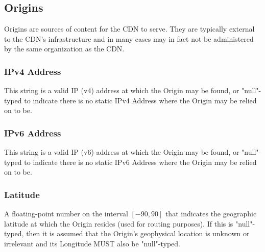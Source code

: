 %
%

\subsection{Origins}
Origins are sources of content for the CDN to serve. They are typically external
to the CDN's infrastructure and in many cases may in fact not be administered by
the same organization as the CDN.


\subsubsection{IPv4 Address}
This string is a valid IP (v4) address at which the Origin may be found, or
"null"-typed to indicate there is no static IPv4 Address where the Origin may be
relied on to be.

\subsubsection{IPv6 Address}
This string is a valid IP (v6) address at which the Origin may be found, or
"null"-typed to indicate there is no static IPv6 Address where the Origin may be
relied on to be.

\subsubsection{Latitude}
A floating-point number on the interval $[-90, 90]$ that indicates the
geographic latitude at which the Origin resides (used for routing purposes). If
this is "null"-typed, then it is assumed that the Origin's geophysical location
is unknown or irrelevant and its Longitude MUST also be "null"-typed.

